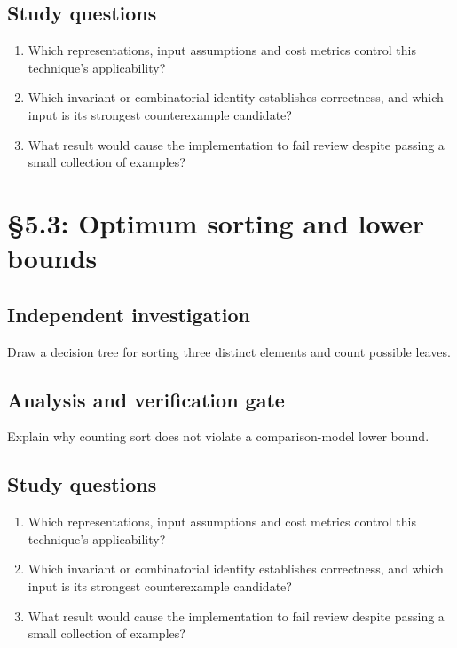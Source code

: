 \documentclass[11pt,letterpaper]{article}
\begin{document}
\subsection{Study questions}
\begin{enumerate}
\item Which representations, input assumptions and cost metrics control this technique's applicability?
\item Which invariant or combinatorial identity establishes correctness, and which input is its strongest counterexample candidate?
\item What result would cause the implementation to fail review despite passing a small collection of examples?
\end{enumerate}

\section{\S 5.3: Optimum sorting and lower bounds}
\subsection{Independent investigation}
Draw a decision tree for sorting three distinct elements and count possible leaves.
\subsection{Analysis and verification gate}
Explain why counting sort does not violate a comparison-model lower bound.
\subsection{Study questions}
\begin{enumerate}
\item Which representations, input assumptions and cost metrics control this technique's applicability?
\item Which invariant or combinatorial identity establishes correctness, and which input is its strongest counterexample candidate?
\item What result would cause the implementation to fail review despite passing a small collection of examples?
\end{enumerate}
\end{document}
